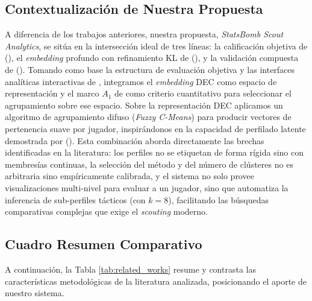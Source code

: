 \documentclass[conference]{IEEEtran}
\begin{document}
\subsection{Contextualización de Nuestra Propuesta}
A diferencia de los trabajos anteriores, nuestra propuesta, \textit{StatsBomb Scout Analytics}, se sitúa en la intersección ideal de tres líneas: la calificación objetiva de \citeauthor{evers2024visual} (\citeyear{evers2024visual}), el \textit{embedding} profundo con refinamiento KL de \citeauthor{demir2026how} (\citeyear{demir2026how}), y la validación compuesta de \citeauthor{akhanli2022clustering} (\citeyear{akhanli2022clustering}). Tomando como base la estructura de evaluación objetiva y las interfaces analíticas interactivas de \citeauthor{evers2024visual}, integramos el \textit{embedding} DEC como espacio de representación y el marco $A_1$ de \citeauthor{akhanli2022clustering} como criterio cuantitativo para seleccionar el agrupamiento sobre ese espacio. Sobre la representación DEC aplicamos un algoritmo de agrupamiento difuso (\textit{Fuzzy C-Means}) para producir vectores de pertenencia suave por jugador, inspirándonos en la capacidad de perfilado latente demostrada por \citeauthor{pacifico2025fuzzy} (\citeyear{pacifico2025fuzzy}). Esta combinación aborda directamente las brechas identificadas en la literatura: los perfiles no se etiquetan de forma rígida sino con membresías continuas, la selección del método y del número de clústeres no es arbitraria sino empíricamente calibrada, y el sistema no solo provee visualizaciones multi-nivel para evaluar a un jugador, sino que automatiza la inferencia de sub-perfiles tácticos (con $k=8$), facilitando las búsquedas comparativas complejas que exige el \textit{scouting} moderno.

\subsection{Cuadro Resumen Comparativo}

A continuación, la Tabla \ref{tab:related_works} resume y contrasta las características metodológicas de la literatura analizada, posicionando el aporte de nuestro sistema.
\end{document}
